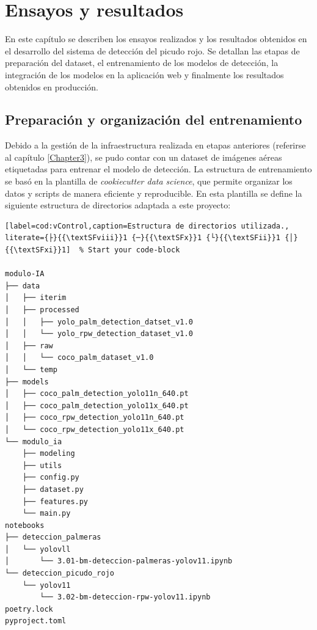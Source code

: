 \chapter{Ensayos y resultados}
\label{Chapter4}
En este capítulo se describen los ensayos realizados y los resultados obtenidos en el desarrollo del sistema de detección del picudo rojo. Se detallan las etapas de preparación del dataset, el entrenamiento de los modelos de detección, la integración de los modelos en la aplicación web y finalmente los resultados obtenidos en producción.

\section{Preparación y organización del entrenamiento}
\label{sec:preparacionDataset}

Debido a la gestión de la infraestructura realizada en etapas anteriores (referirse al capítulo \ref{Chapter3}), se pudo contar con un dataset de imágenes aéreas etiquetadas para entrenar el modelo de detección. La estructura de entrenamiento se basó en la plantilla de \textit{cookiecutter data science}, que permite organizar los datos y scripts de manera eficiente y reproducible. En esta plantilla se define la siguiente estructura de directorios adaptada a este proyecto:

\begin{lstlisting}[label=cod:vControl,caption=Estructura de directorios utilizada., literate={├}{{\textSFviii}}1 {─}{{\textSFx}}1 {└}{{\textSFii}}1 {│}{{\textSFxi}}1]  % Start your code-block

modulo-IA
├── data
│   ├── iterim
│   ├── processed
│   │   ├── yolo_palm_detection_datset_v1.0
│   │   └── yolo_rpw_detection_dataset_v1.0
│   ├── raw
│   │   └── coco_palm_dataset_v1.0
│   └── temp
├── models
│   ├── coco_palm_detection_yolo11n_640.pt
│   ├── coco_palm_detection_yolo11x_640.pt
│   ├── coco_rpw_detection_yolo11n_640.pt
│   └── coco_rpw_detection_yolo11x_640.pt
└── modulo_ia
    ├── modeling
    ├── utils
    ├── config.py
    ├── dataset.py
    ├── features.py
    └── main.py
notebooks
├── deteccion_palmeras
│   └── yolovll
│       └── 3.01-bm-deteccion-palmeras-yolov11.ipynb
└── deteccion_picudo_rojo
    └── yolov11
        └── 3.02-bm-deteccion-rpw-yolov11.ipynb
poetry.lock
pyproject.toml

\end{lstlisting}

